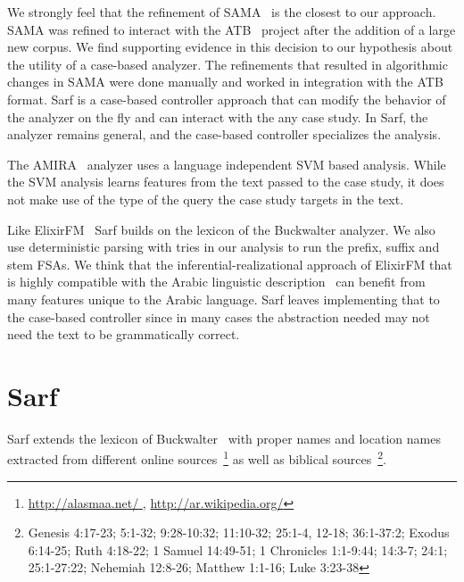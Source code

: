\documentclass[11pt,letterpaper]{article}
\begin{document}

We strongly feel that the refinement of SAMA~\cite{Maamouri:10} 
is the closest to our approach. SAMA was refined to interact with
the ATB~\cite{Maamouri:04} project after the addition of a large 
new corpus. We find supporting evidence in this decision to our hypothesis
about the utility of a case-based analyzer. 
The refinements that resulted in algorithmic changes in SAMA were 
done manually and worked in integration with the ATB format. 
Sarf is a case-based controller approach that can modify 
the behavior of the analyzer on the fly and can interact
with the any case study. In Sarf, the analyzer remains general, and the 
case-based controller specializes the analysis.

The AMIRA~\cite{Diab:07} analyzer uses 
a language independent SVM based analysis. 
While the SVM analysis learns features from the text passed to the case
study, it does not make use of the type of the query the 
case study targets in the text. 

Like ElixirFM~\cite{Otakar:07} Sarf builds on the lexicon
of the Buckwalter analyzer. 
We also use deterministic parsing with tries in our analysis 
to run the prefix, suffix and stem FSAs. 
We think that the inferential-realizational approach 
of ElixirFM
that is highly compatible with the Arabic linguistic 
description~\cite{Badawi:04}
can benefit from many features unique to the Arabic language.
Sarf leaves implementing that to the case-based controller
since in many cases the abstraction needed may not need the 
text to be grammatically correct.

\section{Sarf}
\label{sec:sarf}

Sarf extends the lexicon of Buckwalter~ with 
proper names and location names extracted from different online 
sources~\footnote{\href{http://alasmaa.net/}{http://alasmaa.net/ }, 
\href{http://ar.wikipedia.org/}{http://ar.wikipedia.org/}}
as well as biblical sources~\footnote{Genesis 4:17-23; 5:1-32; 9:28-10:32; 11:10-32; 25:1-4, 12-18; 36:1-37:2; Exodus 6:14-25; Ruth 4:18-22; 1 Samuel 14:49-51; 1 Chronicles 1:1-9:44; 14:3-7; 24:1; 25:1-27:22; Nehemiah 12:8-26; Matthew 1:1-16; Luke 3:23-38}.
\end{document}
